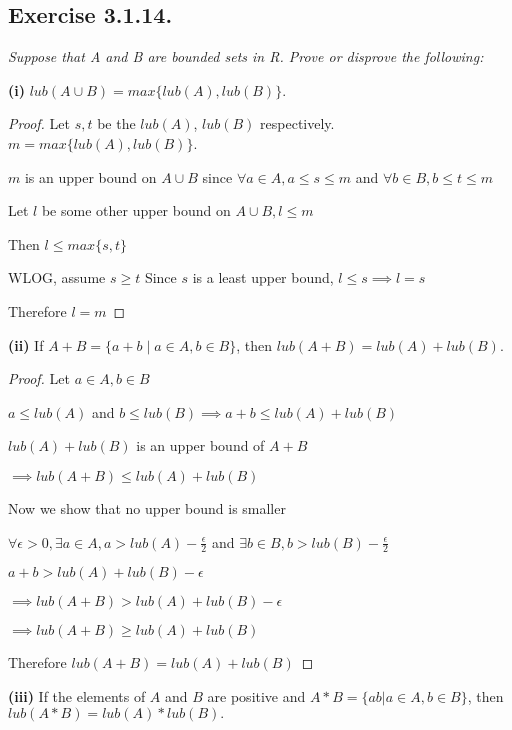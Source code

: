 \documentclass[12pt, a4paper]{article}
\begin{document}
    \subsection*{Exercise 3.1.14.}
    \textit{Suppose that A and B are bounded sets in R. Prove or disprove the following:}
        
    \noindent \textbf{(i)} $lub(A \cup B) = max\{lub(A), lub(B)\}.$
        \begin{proof}
            Let $s,t $ be the $lub(A)$, $lub(B)$ respectively. $m = max\{lub(A), lub(B)\}$. 
            
            $m$ is an upper bound on $A \cup B$ since $\forall a\in A , a \le s \le m$ and $\forall b\in B, b \le t \le m$ 

            Let $l$ be some other upper bound on $A \cup B, l \le m$

            Then $l \le max\{s,t\}$

            WLOG, assume $s \ge t$ Since $s$ is a least upper bound, $l \le s \implies l=s$
            
            Therefore $l=m$
        \end{proof}
    \noindent \textbf{(ii)} If $A + B = \{a + b \mid a \in A, b \in B \}$, then $lub(A + B) = lub(A) + lub(B)$.
        \begin{proof}
            Let $a\in A, b\in B$ 

            $a\le lub(A)$ and $b\le lub(B) \implies a+b \le lub(A) + lub(B)$ 
            
            $lub(A)+lub(B)$ is an upper bound of $A+B$ 

            $\implies lub(A+B) \le lub(A)+lub(B)$

            Now we show that no upper bound is smaller

            $\forall \epsilon > 0, \exists a\in A, a > lub(A)-\frac{\epsilon}{2}$ and $\exists b\in B, b > lub(B)-\frac{\epsilon}{2}$

            $a+b > lub(A)+lub(B)-\epsilon$

            $\implies lub(A+B) > lub(A)+lub(B)-\epsilon$

            $\implies lub(A+B) \ge lub(A)+lub(B)$

            Therefore $lub(A+B) = lub(A)+lub(B)$

        \end{proof}
    \noindent \textbf{(iii)} If the elements of $A$ and $B$ are positive and $A*B = \{ab | a \in A, b \in B\}$, then $lub(A * B) = lub(A)*lub(B).$
\end{document}
